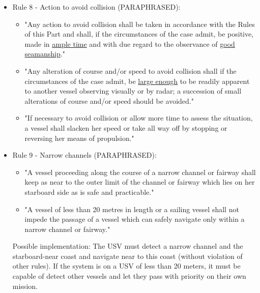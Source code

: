 \begin{itemize}
        \item Rule 8 - Action to avoid collision (PARAPHRASED):
        
            \begin{itemize}
                \item "Any action to avoid collision shall be taken in accordance with the Rules of this Part and shall, if the circumstances of the case admit, be positive, made in \underline{ample time} and with due regard to the observance of \underline{good seamanship}."
                \item "Any alteration of course and/or speed to avoid collision shall if the circumstances of the case admit, be \underline{large enough} to be readily apparent to another vessel observing visually or by radar; a succession of small alterations of course and/or speed should be avoided."
                \item "If necessary to avoid collision or allow more time to assess the situation, a vessel shall slacken her speed or take all way off by stopping or reversing her means of propulsion."
            \end{itemize}
        
        \item Rule 9 - Narrow channels (PARAPHRASED):
        
            \begin{itemize}
                \item "A vessel proceeding along the course of a narrow channel or fairway shall keep as near to the outer limit of the channel or fairway which lies on her starboard side as is safe and practicable."
            
                \item "A vessel of less than 20 metres in length or a sailing vessel shall not impede the passage of a vessel which can safely navigate only within a narrow channel or fairway."
            \end{itemize}
            
            Possible implementation: The \ac{USV} must detect a narrow channel and the starboard-near coast and navigate near to this coast (without violation of other rules). If the system is on a \ac{USV} of less than 20 meters, it must be capable of detect other vessels and let they pass with priority on their own mission.
        

\end{itemize}
